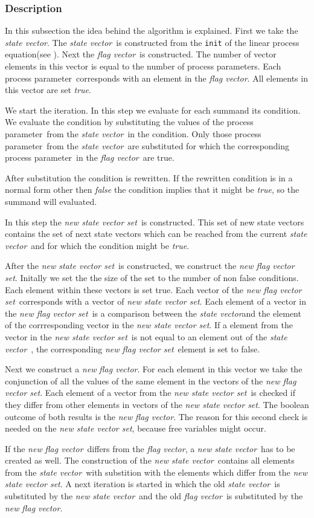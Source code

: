 \documentclass[a4paper,10pt]{article}
\newcommand{\lpe}{linear process equation}
\newcommand{\pp}{process parameter}
\newcommand{\pps}{process parameters}
\newcommand{\ti}{\textit}
\newcommand{\sv}{\textit{state vector}}
\newcommand{\fv}{\textit{flag vector}}
\newcommand{\svs}{\textit{new state vector set}}
\newcommand{\fvs}{\textit{new flag vector set}}
\begin{document}
\subsubsection{Description}\label{sss:desc}
In this subsection the idea behind the algorithm is explained. First we take the \sv . The \sv\ is constructed from the \verb"init" of the \lpe (see \cite{LPE_info}). Next the \fv\ is constructed. The number of vector elements in this vector is equal to the number of \pps . Each \pp\ corresponds with an element in the \fv .  All elements in this vector are set \ti{true}.

 We start the iteration. In this step we evaluate for each summand its condition. We evaluate the condition by substituting the values of the \pp\ from the \sv\ in the condition. Only those \pp\ from the \sv\ are substituted for which the corresponding \pp\ in the \fv\ are true. 

After substitution the condition is rewritten. If the rewritten condition is in a normal form other then \ti{false} the condition implies that it might be \ti{true}, so the summand will evaluated. 

In this step the \svs\ is constructed. This set of new state vectors contains the set of next state vectors which can be reached from the current \sv\ and for which the condition might be \ti{true}. 

After the \svs\ is constructed, we construct the \fvs . Initally we set the the size of the set to the number of non false conditions. Each element within  these vectors is set true. Each vector of the \fvs\ corresponds with a vector of \svs . Each element of a vector in the \fvs\ is a comparison between the \sv and the element of the corrresponding vector in the \svs . If a element from the vector in the \svs\ is not equal to an element out of the \sv\ , the corresponding \fvs\ element is set to false. 

Next we construct a \ti{new} \fv . For each element in this vector we take the conjunction of all the values of the same element in the vectors of the \fvs . Each element of a vector from the \svs\ is checked if they differ from other elements  in vectors of the \svs . The boolean outcome of both results is the \ti{new} \fv . The reason for this second check is needed on the \svs , because free variables might occur. %
 
If the \ti{new} \fv\ differs from the \fv , a \ti{new} \sv\ has to be created as well. The construction of the \ti{new} \sv\ contains all elements from the \sv\ with substition with the elements which differ from the \svs . 
A next iteration is started in which the old \sv\ is substituted by the \ti{new} \sv\ and the old \fv\ is substituted by the \ti{new} \fv .
  
\end{document}
